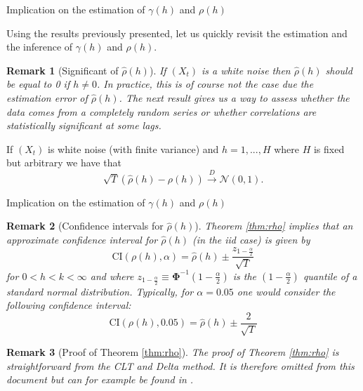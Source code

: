 \documentclass[envcountsect,usenames,dvipsnames]{beamer}
\theoremstyle{mystyle}
\newtheorem{Remark}{Remark}
\begin{document}
\begin{frame}{Implication on the estimation of $\gamma(h)$ and $\rho(h)$}
	\small
	
	Using the results previously presented, let us quickly revisit the estimation and the inference of $\gamma(h)$ and $\rho(h)$.
	
	\vspace{0.25cm}
	\begin{Remark}[Significant of $\hat{\rho}(h)$]
		If $(X_t)$ is a white noise then $\hat{\rho}(h)$ should be equal to 0 if $h \neq 0$. In practice, this is of course not the case due the estimation error of $\hat{\rho}(h)$. The next result gives us a way to assess whether the data comes from a completely random series or whether correlations are statistically significant at some lags.
	\end{Remark}
	
	\begin{Theorem}
	\label{thm:rho}
		If $(X_t)$ is white noise (with finite variance) and $h = 1, ..., H$ where $H$ is fixed but arbitrary we have that
		\begin{equation*}
			\sqrt{T} \left(\hat{\rho}(h) - {\rho}(h)\right) \xrightarrow{{D}}  \mathcal{N}\left(0, 1\right).
		\end{equation*}
	\end{Theorem}
\end{frame}

\begin{frame}{Implication on the estimation of $\gamma(h)$ and $\rho(h)$}
	\small

\begin{Remark}[Confidence intervals for $\hat{\rho}(h)$]
	Theorem \ref{thm:rho} implies that an approximate confidence interval for $\hat{\rho}(h)$ (in the iid case) is given by
	\begin{equation*}
	    \text{CI}({\rho}(h), \alpha) = \hat{\rho}(h) \pm \frac{z_{1-\frac{\alpha}{2}} }{\sqrt{T}}
	\end{equation*}
	for $0 < h < k < \infty$ and where $z_{1- \frac{\alpha}{2}} \equiv \bm{\Phi}^{-1}\left( 1- \frac{\alpha}{2} \right)$ is the $(1- \frac{\alpha}{2})$ quantile of a standard normal distribution. Typically, for $\alpha = 0.05$ one would consider the following confidence interval:
	\begin{equation*}
	    \text{CI}({\rho}(h), 0.05) = \hat{\rho}(h) \pm \frac{2}{\sqrt{T}}
	\end{equation*}
	\end{Remark}
	
	
	\begin{Remark}[Proof of Theorem \ref{thm:rho}]
	The proof of Theorem \ref{thm:rho} is straightforward from the CLT and Delta method. It is therefore omitted from this document but can for example be found in \cite{hamilton1994time}.
	\end{Remark}
\end{frame}
\end{document}
